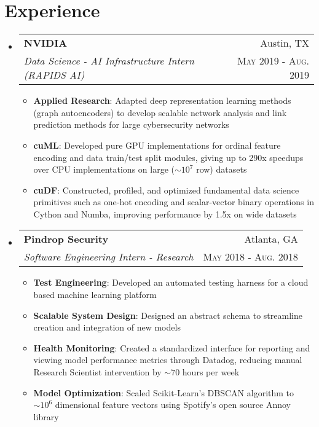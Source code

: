 \documentclass[letterpaper,11pt]{article}
\makeatletter
\newcommand{\resumeItem}[2]{
  \item\small{
    \textbf{#1}{: #2 \vspace{-2pt}}
  }
}
\newcommand{\resumeSubheading}[4]{
  \vspace{-1pt}\item[]
    \begin{tabular*}{0.97\textwidth}{l@{\extracolsep{\fill}}r}
      \textbf{#1} & #2 \\
      \textit{\small#3} & \textsc{\small #4} \\ %
    \end{tabular*}\vspace{-5pt}
}
\newcommand{\resumeSubHeadingListStart}{\begin{itemize}[leftmargin=*]}
\newcommand{\resumeSubHeadingListEnd}{\end{itemize}}
\newcommand{\resumeItemListStart}{\begin{itemize}}
\newcommand{\resumeItemListEnd}{\end{itemize}\vspace{-5pt}}
\newenvironment{resumeItemList}{\resumeItemListStart}{\resumeItemListEnd}
\newenvironment{resumeSubheadingList}{\resumeSubHeadingListStart}{\resumeSubHeadingListEnd}
\makeatother
\begin{document}
\section{Experience}
  \begin{resumeSubheadingList}
    \resumeSubheading
      {NVIDIA}{Austin, TX}
      {Data Science - AI Infrastructure Intern (RAPIDS AI)}{May 2019 - Aug. 2019}
      \begin{resumeItemList}
        \resumeItem{Applied Research}{Adapted deep representation learning methods (graph autoencoders) to develop scalable
        network analysis and link prediction methods for large cybersecurity networks}
        \resumeItem{cuML}{Developed pure GPU implementations for ordinal feature encoding and data train/test split modules,
        giving up to 290x speedups over CPU implementations on large ($\sim 10^7$ row) datasets}
        \resumeItem{cuDF}{Constructed, profiled, and optimized fundamental data science primitives such as one-hot encoding and scalar-vector binary operations
        in Cython and Numba, improving performance by 1.5x on wide datasets}
      \end{resumeItemList}

    \resumeSubheading
    {Pindrop Security}{Atlanta, GA}
    {Software Engineering Intern - Research}{May 2018 - Aug. 2018}
    \begin{resumeItemList}
      \resumeItem{Test Engineering}{Developed an automated testing harness for a cloud based machine learning platform}
      \resumeItem{Scalable System Design}{Designed an abstract schema to streamline creation and integration of new models}
      \resumeItem{Health Monitoring}{Created a standardized interface for reporting and viewing model performance metrics through
      Datadog, reducing manual Research Scientist intervention by $\sim 70$ hours per week}
      \resumeItem{Model Optimization}{Scaled Scikit-Learn's DBSCAN algorithm to $\sim 10^6$ dimensional feature vectors using 
      Spotify's open source Annoy library}
    \end{resumeItemList}
  \end{resumeSubheadingList}

\end{document}
